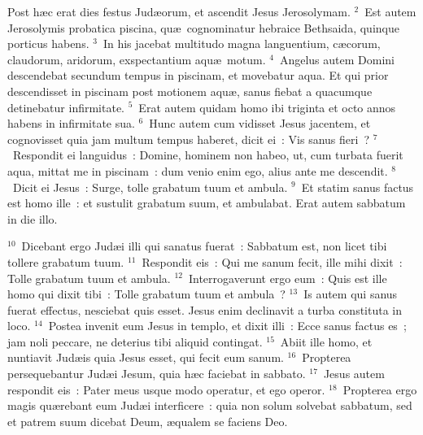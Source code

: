 \lettrine[lines=3,image=true,loversize=0.05,lraise=-0.03]{P}{}ost h\ae c erat dies festus Jud\ae orum, et ascendit Jesus Jerosolymam.
${}^{2}$~Est autem Jerosolymis probatica piscina, qu\ae\ cognominatur hebraice Bethsaida, quinque porticus habens.
${}^{3}$~In his jacebat multitudo magna languentium, c\ae corum, claudorum, aridorum, exspectantium aqu\ae\ motum.
${}^{4}$~Angelus autem Domini descendebat secundum tempus in piscinam, et movebatur aqua. Et qui prior descendisset in piscinam post motionem aqu\ae , sanus fiebat a quacumque detinebatur infirmitate.
${}^{5}$~Erat autem quidam homo ibi triginta et octo annos habens in infirmitate sua.
${}^{6}$~Hunc autem cum vidisset Jesus jacentem, et cognovisset quia jam multum tempus haberet, dicit ei~: Vis sanus fieri~?
${}^{7}$~Respondit ei languidus~: Domine, hominem non habeo, ut, cum turbata fuerit aqua, mittat me in piscinam~: dum venio enim ego, alius ante me descendit.
${}^{8}$~Dicit ei Jesus~: Surge, tolle grabatum tuum et ambula.
${}^{9}$~Et statim sanus factus est homo ille~: et sustulit grabatum suum, et ambulabat. Erat autem sabbatum in die illo.


${}^{10}$~Dicebant ergo Jud\ae i illi qui sanatus fuerat~: Sabbatum est, non licet tibi tollere grabatum tuum.
${}^{11}$~Respondit eis~: Qui me sanum fecit, ille mihi dixit~: Tolle grabatum tuum et ambula.
${}^{12}$~Interrogaverunt ergo eum~: Quis est ille homo qui dixit tibi~: Tolle grabatum tuum et ambula~?
${}^{13}$~Is autem qui sanus fuerat effectus, nesciebat quis esset. Jesus enim declinavit a turba constituta in loco.
${}^{14}$~Postea invenit eum Jesus in templo, et dixit illi~: Ecce sanus factus es~; jam noli peccare, ne deterius tibi aliquid contingat.
${}^{15}$~Abiit ille homo, et nuntiavit Jud\ae is quia Jesus esset, qui fecit eum sanum.
${}^{16}$~Propterea persequebantur Jud\ae i Jesum, quia h\ae c faciebat in sabbato.
${}^{17}$~Jesus autem respondit eis~: Pater meus usque modo operatur, et ego operor.
${}^{18}$~Propterea ergo magis qu\ae rebant eum Jud\ae i interficere~: quia non solum solvebat sabbatum, sed et patrem suum dicebat Deum, \ae qualem se faciens Deo.

